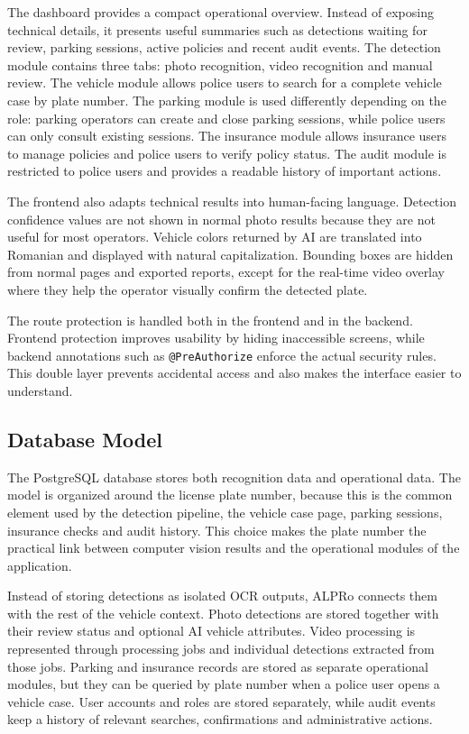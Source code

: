 ﻿\documentclass[12pt,a4paper]{article}
\begin{document}
The dashboard provides a compact operational overview. Instead of exposing technical details, it presents useful summaries such as detections waiting for review, parking sessions, active policies and recent audit events. The detection module contains three tabs: photo recognition, video recognition and manual review. The vehicle module allows police users to search for a complete vehicle case by plate number. The parking module is used differently depending on the role: parking operators can create and close parking sessions, while police users can only consult existing sessions. The insurance module allows insurance users to manage policies and police users to verify policy status. The audit module is restricted to police users and provides a readable history of important actions.

The frontend also adapts technical results into human-facing language. Detection confidence values are not shown in normal photo results because they are not useful for most operators. Vehicle colors returned by AI are translated into Romanian and displayed with natural capitalization. Bounding boxes are hidden from normal pages and exported reports, except for the real-time video overlay where they help the operator visually confirm the detected plate.

The route protection is handled both in the frontend and in the backend. Frontend protection improves usability by hiding inaccessible screens, while backend annotations such as \texttt{@PreAuthorize} enforce the actual security rules. This double layer prevents accidental access and also makes the interface easier to understand.

\subsection{Database Model}

The PostgreSQL database stores both recognition data and operational data. The model is organized around the license plate number, because this is the common element used by the detection pipeline, the vehicle case page, parking sessions, insurance checks and audit history. This choice makes the plate number the practical link between computer vision results and the operational modules of the application.

Instead of storing detections as isolated OCR outputs, ALPRo connects them with the rest of the vehicle context. Photo detections are stored together with their review status and optional AI vehicle attributes. Video processing is represented through processing jobs and individual detections extracted from those jobs. Parking and insurance records are stored as separate operational modules, but they can be queried by plate number when a police user opens a vehicle case. User accounts and roles are stored separately, while audit events keep a history of relevant searches, confirmations and administrative actions.
\end{document}
